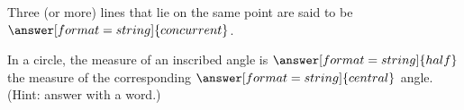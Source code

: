 \documentclass[nooutcomes]{ximera}
\begin{document}
\begin{question}  
Three (or more) lines that lie on the same point are said to be $\answer[format=string]{concurrent}$.  
\end{question}

\begin{question}  
In a circle, the measure of an inscribed angle is $\answer[format=string]{half}$ the measure of the corresponding $\answer[format=string]{central}$ angle.  (Hint: answer with a word.)
\end{question}



\end{document}
